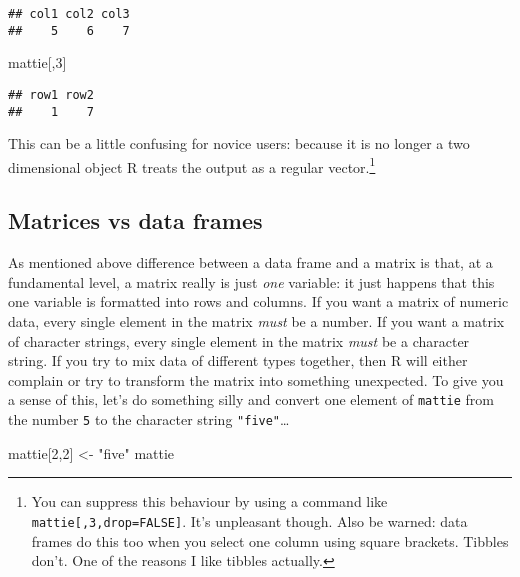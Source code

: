 \documentclass[]{book}
\newenvironment{Shaded}{\begin{snugshade}}{\end{snugshade}}
\newcommand{\DecValTok}[1]{\textcolor[rgb]{0.00,0.00,0.81}{#1}}
\newcommand{\NormalTok}[1]{#1}
\newcommand{\StringTok}[1]{\textcolor[rgb]{0.31,0.60,0.02}{#1}}
\let\rmarkdownfootnote\footnote%
\def\footnote{\protect\rmarkdownfootnote}
\begin{document}
\begin{verbatim}
## col1 col2 col3 
##    5    6    7
\end{verbatim}

\begin{Shaded}
\begin{Highlighting}[]
\NormalTok{mattie[,}\DecValTok{3}\NormalTok{]}
\end{Highlighting}
\end{Shaded}

\begin{verbatim}
## row1 row2 
##    1    7
\end{verbatim}

This can be a little confusing for novice users: because it is no longer a two dimensional object R treats the output as a regular vector.\footnote{You can suppress this behaviour by using a command like \texttt{mattie{[},3,drop=FALSE{]}}. It's unpleasant though. Also be warned: data frames do this too when you select one column using square brackets. Tibbles don't. One of the reasons I like tibbles actually.}

\hypertarget{matrices-vs-data-frames}{%
\subsection{Matrices vs data frames}\label{matrices-vs-data-frames}}

As mentioned above difference between a data frame and a matrix is that, at a fundamental level, a matrix really is just \emph{one} variable: it just happens that this one variable is formatted into rows and columns. If you want a matrix of numeric data, every single element in the matrix \emph{must} be a number. If you want a matrix of character strings, every single element in the matrix \emph{must} be a character string. If you try to mix data of different types together, then R will either complain or try to transform the matrix into something unexpected. To give you a sense of this, let's do something silly and convert one element of \texttt{mattie} from the number \texttt{5} to the character string \texttt{"five"}\ldots{}

\begin{Shaded}
\begin{Highlighting}[]
\NormalTok{mattie[}\DecValTok{2}\NormalTok{,}\DecValTok{2}\NormalTok{] <-}\StringTok{ "five"} 
\NormalTok{mattie}
\end{Highlighting}
\end{Shaded}
\end{document}
